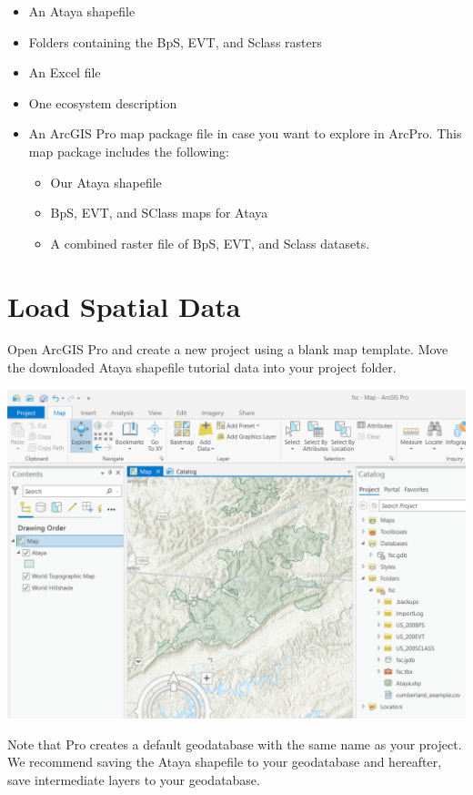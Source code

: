 \documentclass[
]{book}
\providecommand{\tightlist}{%
  \setlength{\itemsep}{0pt}\setlength{\parskip}{0pt}}
\begin{document}
\begin{itemize}
\tightlist
\item
  An Ataya shapefile
\item
  Folders containing the BpS, EVT, and Sclass rasters
\item
  An Excel file
\item
  One ecosystem description
\item
  An ArcGIS Pro map package file in case you want to explore in ArcPro. This map package includes the following:

  \begin{itemize}
  \tightlist
  \item
    Our Ataya shapefile
  \item
    BpS, EVT, and SClass maps for Ataya
  \item
    A combined raster file of BpS, EVT, and Sclass datasets.
  \end{itemize}
\end{itemize}

\hypertarget{load-spatial-data}{%
\section{Load Spatial Data}\label{load-spatial-data}}

Open ArcGIS Pro and create a new project using a blank map template. Move the downloaded Ataya shapefile tutorial data into your project folder.

\includegraphics[width=1000pt]{04_gis_screenshots/1_load_data}

Note that Pro creates a default geodatabase with the same name as your project. We recommend saving the Ataya shapefile to your geodatabase and hereafter, save intermediate layers to your geodatabase.
\end{document}
